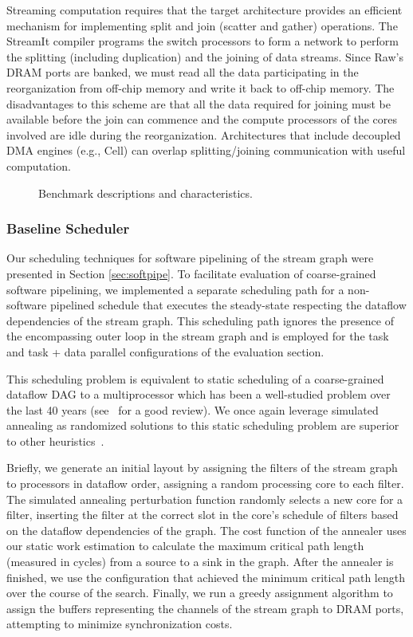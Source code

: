 Streaming computation requires that the target architecture provides
an efficient mechanism for implementing split and join (scatter and
gather) operations.  The StreamIt compiler programs the switch
processors to form a network to perform the splitting (including
duplication) and the joining of data streams.  Since Raw's DRAM ports
are banked, we must read all the data participating in the
reorganization from off-chip memory and write it back to off-chip
memory.  The disadvantages to this scheme are that all the data
required for joining must be available before the join can commence
and the compute processors of the cores involved are idle during the
reorganization.  Architectures that include decoupled DMA engines
(e.g., Cell) can overlap splitting/joining communication with useful
computation.

\begin{figure*}[t]
\centering
{}
\caption{Benchmark descriptions and characteristics.
\protect\label{fig:benchchar}}
\vspace{-6pt}
\end{figure*}

\subsubsection{Baseline Scheduler}
Our scheduling techniques for software pipelining of the stream graph
were presented in Section \ref{sec:softpipe}.  To facilitate
evaluation of coarse-grained software pipelining, we implemented a
separate scheduling path for a non-software pipelined schedule that
executes the steady-state respecting the dataflow dependencies of the
stream graph.  This scheduling path ignores the presence of the
encompassing outer loop in the stream graph and is employed for the
task and task + data parallel configurations of the evaluation section.

This scheduling problem is equivalent to static scheduling of a
coarse-grained dataflow DAG to a multiprocessor which has been a
well-studied problem over the last 40 years (see~\cite{DAGSched} for a
good review).  We once again leverage simulated annealing as
randomized solutions to this static scheduling problem are superior to
other heuristics~\cite{kwok99fastest}.

Briefly, we generate an initial layout by assigning the filters of the
stream graph to processors in dataflow order, assigning a random
processing core to each filter. The simulated annealing perturbation
function randomly selects a new core for a filter, inserting the
filter at the correct slot in the core's schedule of filters based on
the dataflow dependencies of the graph.  The cost function of the
annealer uses our static work estimation to calculate the maximum
critical path length (measured in cycles) from a source to a sink in
the graph.  After the annealer is finished, we use the configuration
that achieved the minimum critical path length over the course of the
search.  Finally, we run a greedy assignment algorithm to assign the
buffers representing the channels of the stream graph to DRAM ports,
attempting to minimize synchronization costs.

